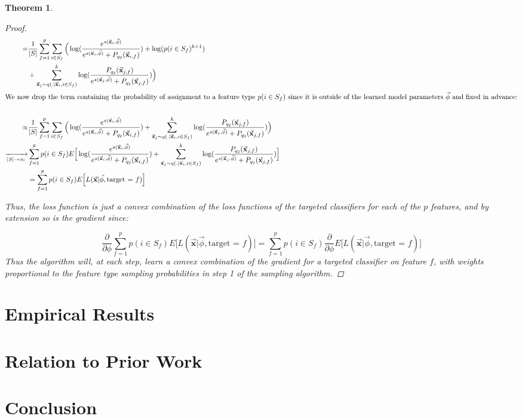 \documentclass{article} %
\newtheorem{theorem}{Theorem}
\begin{document}
\begin{theorem}
\begin{proof}
\begin{align*}
   = & \frac{1}{|S|}\sum_{f=1}^p \sum_{i \in S_f} \Big( \log(\frac{e^{s(\vec{\mathbf{x}}_i,\vec{\phi}) }}{e^{s(\vec{\mathbf{x}}_i,\vec{\phi}) } + P_{q_2}(\vec{\mathbf{x}}_{i,f}) }) + \log(p(i \in S_f)^{k+1})\\
  &   +  \sum_{\vec{\mathbf{x}}_{j} \sim q(.|\vec{\mathbf{x}}_i,i\in S_f)}^k \log(\frac{ P_{q_2}(\vec{\mathbf{x}}_{j,f})}{e^{s(\vec{\mathbf{x}}_{j},\vec{\phi}) } + P_{q_2}(\vec{\mathbf{x}}_{j,f})})   \Big) \\
\intertext{We now drop the term containing the probability of assignment to a feature type $p(i \in S_f)$ since it is outside of the learned model parameters $\vec{\phi}$ and fixed in advance:}\\
    \propto & \frac{1}{|S|} \sum_{f=1}^p \sum_{i \in S_f} \Big( \log(\frac{e^{s(\vec{\mathbf{x}}_i,\vec{\phi}) }}{e^{s(\vec{\mathbf{x}}_i,\vec{\phi}) } + P_{q_2}(\vec{\mathbf{x}}_{i,f}) }) + \sum_{\vec{\mathbf{x}}_{j} \sim q(.|\vec{\mathbf{x}}_i,i\in S_f)}^k \log(\frac{ P_{q_2}(\vec{\mathbf{x}}_{j,f})}{e^{s(\vec{\mathbf{x}}_{j},\vec{\phi}) } + P_{q_2}(\vec{\mathbf{x}}_{j,f})}) \Big) \\
    \xrightarrow[|S|\rightarrow \infty]{ }  & \sum_{f=1}^p p(i \in S_f) E\Big[ \log(\frac{e^{s(\vec{\mathbf{x}}_i,\vec{\phi}) }}{e^{s(\vec{\mathbf{x}}_i,\vec{\phi}) } + P_{q_2}(\vec{\mathbf{x}}_{i,f}) }) + \sum_{\vec{\mathbf{x}}_{j} \sim q(.|\vec{\mathbf{x}}_i,i\in S_f)}^k \log(\frac{ P_{q_2}(\vec{\mathbf{x}}_{j,f})}{e^{s(\vec{\mathbf{x}}_{j},\vec{\phi}) } + P_{q_2}(\vec{\mathbf{x}}_{j,f})}) \Big] \\
   & = \sum_{f=1}^p p(i \in S_f) E\Big[ L(\vec{\mathbf{x}} |\vec{\phi}, \text{target = $f$}) \Big]
\end{align*}

Thus, the loss function is just a convex combination  of the loss functions of the targeted classifiers for each of the $p$ features, and by extension so is the gradient since:

\[\frac{\partial }{\partial \phi}\sum_{f=1}^p p(i \in S_f) E\Big[ L(\vec{\mathbf{x}} |\vec{\phi}, \text{target = $f$}) \Big] =
 \sum_{f=1}^p p(i \in S_f) \frac{\partial }{\partial \phi}E\Big[ L(\vec{\mathbf{x}} |\vec{\phi}, \text{target = $f$}) \Big]\]
 Thus the algorithm will, at each step, learn a convex combination of the gradient for a targeted classifier on feature $f$, with weights proportional to the feature type sampling probabilities in step 1 of the sampling algorithm.

\end{proof}
\end{theorem}


\section{Empirical Results}


\section{Relation to Prior Work}


\section{Conclusion}





\end{document}
